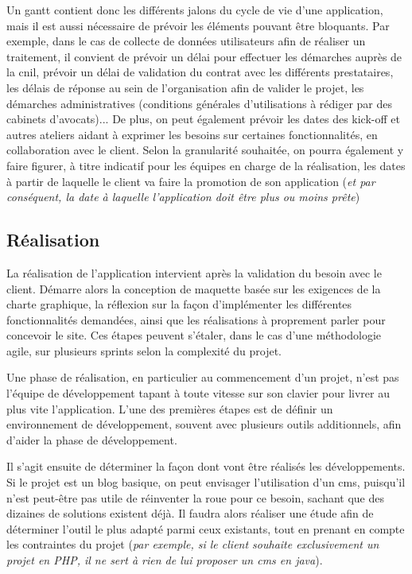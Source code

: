 Un \gls{gantt} contient donc les différents jalons du cycle de vie d'une application, mais il est aussi nécessaire de prévoir les éléments pouvant être bloquants. Par exemple, dans le cas de collecte de données utilisateurs afin de réaliser un traitement, il convient de prévoir un délai pour effectuer les démarches auprès de la \gls{cnil}, prévoir un délai de validation du contrat avec les différents prestataires, les délais de réponse au sein de l'organisation afin de valider le projet, les démarches administratives (conditions générales d'utilisations à rédiger par des cabinets d'avocats)... De plus, on peut également prévoir les dates des kick-off et autres ateliers aidant à exprimer les besoins sur certaines fonctionnalités, en collaboration avec le client. Selon la granularité souhaitée, on pourra également y faire figurer, à titre indicatif pour les équipes en charge de la réalisation, les dates à partir de laquelle le client va faire la promotion de son application (\emph{et par conséquent, la date à laquelle l'application doit être plus ou moins prête})

\subsection{Réalisation}

La réalisation de l'application intervient après la validation du besoin avec le client. Démarre alors la conception de maquette basée sur les exigences de la charte graphique, la réflexion sur la façon d'implémenter les différentes fonctionnalités demandées, ainsi que les réalisations à proprement parler pour concevoir le site. Ces étapes peuvent s'étaler, dans le cas d'une méthodologie agile, sur plusieurs sprints selon la complexité du projet.

Une phase de réalisation, en particulier au commencement d'un projet, n'est pas l'équipe de développement tapant à toute vitesse sur son clavier pour livrer au plus vite l'application. L'une des premières étapes est de définir un environnement de développement, souvent avec plusieurs outils additionnels, afin d'aider la phase de développement.


Il s'agit ensuite de déterminer la façon dont vont être réalisés les développements. Si le projet est un blog basique, on peut envisager l'utilisation d'un \gls{cms}, puisqu'il n'est peut-être pas utile de réinventer la roue pour ce besoin, sachant que des dizaines de solutions existent déjà. Il faudra alors réaliser une étude afin de déterminer l'outil le plus adapté parmi ceux existants, tout en prenant en compte les contraintes du projet (\emph{par exemple, si le client souhaite exclusivement un projet en \gls{PHP}, il ne sert à rien de lui proposer un \gls{cms} en java}).

